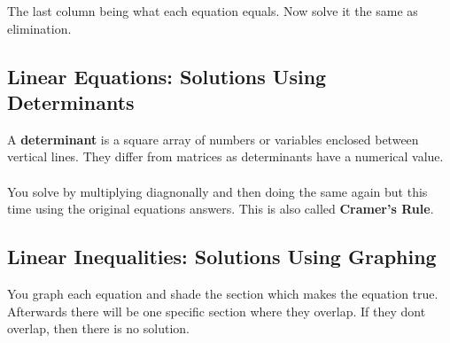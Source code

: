 \documentclass{article}
\begin{document}
The last column being what each equation equals. Now solve it the same as elimination.

\subsection{Linear Equations: Solutions Using Determinants}
A \textbf{determinant} is a square array of numbers or variables enclosed between vertical lines. They differ from matrices as determinants have a numerical value. \\
\\
You solve by multiplying diagnonally and then doing the same again but this time using the original equations answers. This is also called \textbf{Cramer's Rule}.
\\

\subsection{Linear Inequalities: Solutions Using Graphing}
You graph each equation and shade the section which makes the equation true. Afterwards there will be one specific section where they overlap. If they dont overlap, then there is no solution.
\end{document}
